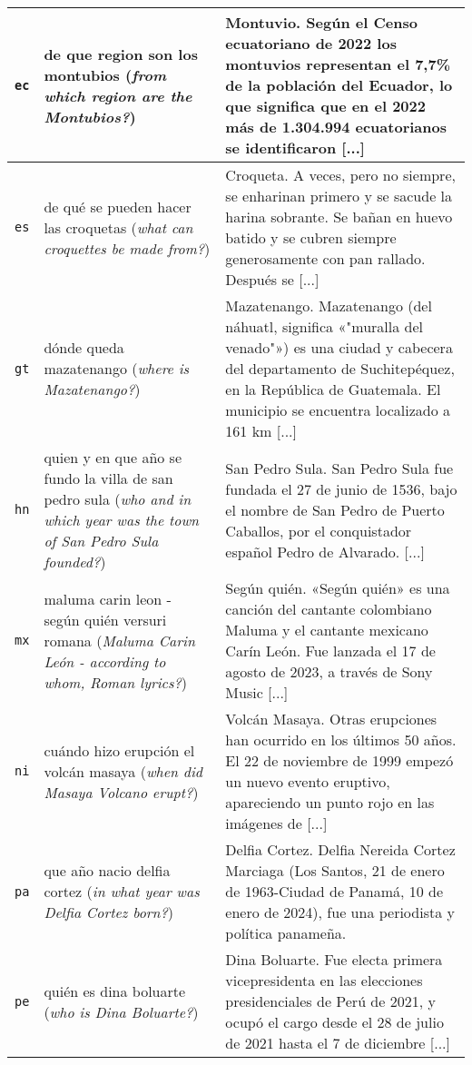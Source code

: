\begin{tabularx}{\textwidth}{%
  >{\centering\arraybackslash}m{} 
  >{\centering\arraybackslash}m{} 
  >{\scriptsize\raggedright\arraybackslash}m{}
}
\midrule
\texttt{ec} & de que region son los montubios (\emph{from which region are the Montubios?}) & Montuvio. Según el Censo ecuatoriano de 2022 los montuvios representan el 7,7\% de la población del Ecuador, lo que significa que en el 2022 más de 1.304.994 ecuatorianos se identificaron [...] \\ 
\midrule
\texttt{es} & de qué se pueden hacer las croquetas (\emph{what can croquettes be made from?}) & Croqueta. A veces, pero no siempre, se enharinan primero y se sacude la harina sobrante. Se bañan en huevo batido y se cubren siempre generosamente con pan rallado. Después se [...] \\ 
\midrule
\texttt{gt} & dónde queda mazatenango (\emph{where is Mazatenango?}) & Mazatenango. Mazatenango (del náhuatl, significa «"muralla del venado"») es una ciudad y cabecera del departamento de Suchitepéquez, en la República de Guatemala. El municipio se encuentra localizado a 161 km [...] \\ 
\midrule
\texttt{hn} & quien y en que año se fundo la villa de san pedro sula (\emph{who and in which year was the town of San Pedro Sula founded?}) & San Pedro Sula. San Pedro Sula fue fundada el 27 de junio de 1536, bajo el nombre de San Pedro de Puerto Caballos, por el conquistador español Pedro de Alvarado. [...] \\ 
\midrule
\texttt{mx} & maluma carin leon - según quién versuri romana (\emph{Maluma Carin León - according to whom, Roman lyrics?}) & Según quién. «Según quién» es una canción del cantante colombiano Maluma y el cantante mexicano Carín León. Fue lanzada el 17 de agosto de 2023, a través de Sony Music [...] \\ 
\midrule
\texttt{ni} & cuándo hizo erupción el volcán masaya (\emph{when did Masaya Volcano erupt?}) & Volcán Masaya. Otras erupciones han ocurrido en los últimos 50 años. El 22 de noviembre de 1999 empezó un nuevo evento eruptivo, apareciendo un punto rojo en las imágenes de [...] \\ 
\midrule
\texttt{pa} & que año nacio delfia cortez (\emph{in what year was Delfia Cortez born?}) & Delfia Cortez. Delfia Nereida Cortez Marciaga (Los Santos, 21 de enero de 1963-Ciudad de Panamá, 10 de enero de 2024), fue una periodista y política panameña. \\ 
\midrule
\texttt{pe} & quién es dina boluarte (\emph{who is Dina Boluarte?}) & Dina Boluarte. Fue electa primera vicepresidenta en las elecciones presidenciales de Perú de 2021, y ocupó el cargo desde el 28 de julio de 2021 hasta el 7 de diciembre [...] \\ 

\end{tabularx}
